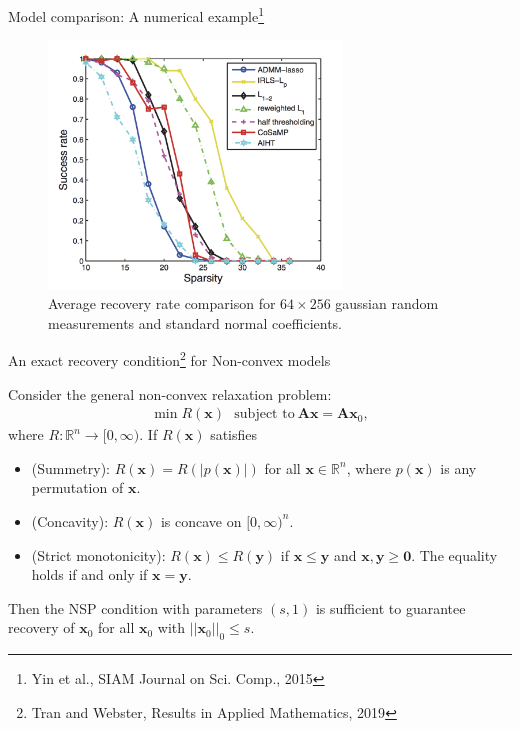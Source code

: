 \documentclass[11pt]{beamer}
\def\R{{\mathbb R}}
\def\R{{\mathbb R}}
\def\A{{\mathbf A}}
\def\x{{\mathbf x}}
\def\y{{\mathbf{y}}}
\begin{document}
\begin{frame}
{Model comparison: A numerical example\footnote{Yin et al., SIAM Journal on Sci. Comp., 2015}}
\begin{figure}
\begin{center}
\includegraphics[width=7.8cm]{comparison.png}
\caption{Average recovery rate comparison for $64\times 256$ gaussian random measurements and standard normal coefficients.}
\end{center}
\end{figure}

\end{frame}


\begin{frame}
{An exact recovery condition\footnote{Tran and Webster, Results in Applied Mathematics, 2019} for Non-convex models}

\begin{Theorem}
Consider the general non-convex relaxation problem:
\begin{align*}
\min R(\x) \ \ \ \text{subject to}\ \A\x=\A\x_0,
\end{align*}
where $R:\R^n\rightarrow [0, \infty)$. If $R(\x)$ satisfies
\begin{itemize}
\item (Summetry): $R(\x)=R(|p(\x)|)$ for all $\x\in\R^n$, where $p(\x)$ is any permutation of $\x$. 
\item (Concavity): $R(\x)$ is concave on $[0,\infty)^n$.  
\item (Strict monotonicity): $R(\x)\leq R(\y)$ if $\x\leq \y$ and $\x, \y\geq \mathbf{0}$. The equality holds if and only if $\x=\y$.  
\end{itemize}
Then the NSP condition with parameters $(s,1)$ is sufficient to guarantee recovery of $\x_0$ for all $\x_0$ with $||\x_0||_0\leq s$. 
\end{Theorem}

\end{frame}
\end{document}
